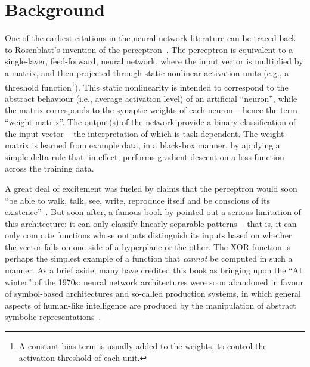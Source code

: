 \chapter{Background}
\label{chapt:background}


One of the earliest citations in the neural network literature can be traced back to Rosenblatt's invention of the perceptron~\citep{rosenblatt1958perceptron}.
The perceptron is equivalent to a single-layer, feed-forward, neural network, where the input vector is multiplied by a matrix, and then projected through static nonlinear activation units (e.g., a threshold function\footnote{A constant bias term is usually added to the weights, to control the activation threshold of each unit.}).
This static nonlinearity is intended to correspond to the abstract behaviour (i.e., average activation level) of an artificial ``neuron'', while the matrix corresponds to the synaptic weights of each neuron -- hence the term ``weight-matrix''.
The output(s) of the network provide a binary classification of the input vector -- the interpretation of which is task-dependent.
The weight-matrix is learned from example data, in a black-box manner, by applying a simple delta rule that, in effect, performs gradient descent on a loss function across the training data.

A great deal of excitement was fueled by claims that the perceptron would soon ``be able to walk, talk, see, write, reproduce itself and be conscious of its existence''~\citep{historyofperceptrons}.
But soon after, a famous book by \citet{minsky1969perceptrons} pointed out a serious limitation of this architecture: it can only classify linearly-separable patterns -- that is, it can only compute functions whose outputs distinguish its inputs based on whether the vector falls on one side of a hyperplane or the other.
The XOR function is perhaps the simplest example of a function that \emph{cannot} be computed in such a manner.
As a brief aside, many have credited this book as bringing upon the ``AI winter'' of the 1970s: neural network architectures were soon abandoned in favour of symbol-based architectures and so-called production systems, in which general aspects of human-like intelligence are produced by the manipulation of abstract symbolic representations~\citep{historyofperceptrons, newell1972human}.

